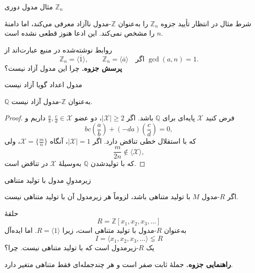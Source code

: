 \begin{frame}[t]{مثال مدول دوری \texorpdfstring{$\mathbb Z_n$}{Z_n}}
    \label{lec09:zn-example}
    \begin{alertblock}{شرط مثال در انتظار تأیید }
        جزوه $\mathbb Z_n$ را به‌عنوان $\mathbb Z$-مدول ناآزاد معرفی می‌کند،
        اما دامنهٔ $n$ را مشخص نمی‌کند. این ادعا هنوز قطعی نشده است.
    \end{alertblock}
    روابط نوشته‌شده در منبع عبارت‌اند از
    \[
        \mathbb Z_n=\langle\overline1\rangle,
        \qquad
        \mathbb Z_n=\langle\overline a\rangle
        \quad\text{اگر }\gcd(a,n)=1.
    \]
    \textbf{پرسش جزوه.} چرا این مدول آزاد نیست؟
\end{frame}

\begin{frame}[t]{مدول اعداد گویا آزاد نیست}
    \label{lec09:rationals-not-free}
    \begin{example}
        $\mathbb Q$ به‌عنوان $\mathbb Z$-مدول آزاد نیست.
    \end{example}
    \begin{proof}
        فرض کنید $\mathcal X$ پایه‌ای برای $\mathbb Q$ باشد.
        اگر $|\mathcal X|\ge2$، دو عضو $\frac ab,\frac cd\in\mathcal X$ داریم و
        \[
            bc\left(\frac ab\right)+(-da)\left(\frac cd\right)=0,
        \]
        که با استقلال خطی تناقض دارد.
        اگر $|\mathcal X|=1$، آنگاه $\mathcal X=\{\frac mn\}$، ولی
        \[
            \frac{m}{2n}\notin\langle\mathcal X\rangle,
        \]
        که با تولیدشدن $\mathbb Q$ به‌وسیلهٔ $\mathcal X$ در تناقض است.
    \end{proof}
\end{frame}

\begin{frame}[t]{زیرمدولِ مدول با تولید متناهی}
    \label{lec09:non-finitely-generated-submodule}
    \begin{remark}
        اگر $R$-مدول $M$ با تولید متناهی باشد، لزوماً هر زیرمدول آن با تولید
        متناهی نیست.
    \end{remark}
    \begin{example}
        حلقهٔ
        \[
            R=\mathbb Z[x_1,x_2,x_3,\ldots]
        \]
        به‌عنوان $R$-مدول با تولید متناهی است، زیرا $R=\langle1\rangle$.
        اما ایده‌آل
        \[
            I=\langle x_1,x_2,x_3,\ldots\rangle\lneq R
        \]
        یک $R$-زیرمدول است که با تولید متناهی نیست. چرا؟
    \end{example}
    \textbf{راهنمایی جزوه.} جملهٔ ثابت صفر است و هر چندجمله‌ای فقط متناهی
    متغیر دارد.
\end{frame}

